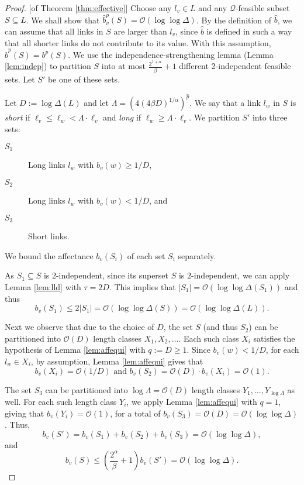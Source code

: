\documentclass[11pt]{amsart}
\newcommand{\cal}[1]{\mathcal{#1}}
\newcommand{\BO}{\mathcal{O}}
\def\calQ{{\cal Q}}
\begin{document}
\begin{proof}{[of Theorem \ref{thm:effective}]}
Choose any $l_v \in L$ and any $\calQ$-feasible subset $S \subseteq L$. We shall show that $\hat{b}^p_v(S)  = \BO(\log \log \Delta)$. By the definition of $\hat b$,
we can assume that all links in $S$ are larger than $l_v$, since $\hat b$ is defined in such a way that all shorter links do not contribute to its value. With this assumption, $\hat b^p(S) = b^p(S)$. 
We use the independence-strengthening lemma (Lemma \ref{lem:indep}) 
to partition $S$ into
at most $\frac{2^{1+\alpha}}{\beta}+1$ different 2-independent feasible sets. 
Let $S'$ be one of these sets.

Let $D := \log \Delta(L)$ and let $\Lambda = (4 (4\beta D)^{1/\alpha})^{\hat{p}}$.
We say that a link $l_w$ in $S$ is \emph{short} if
$\ell_v \le \ell_w < \Lambda \cdot \ell_v$
and \emph{long} if $\ell_w \ge \Lambda \cdot \ell_v$.
We partition $S'$ into three sets:


\begin{description}
\item[$S_1$] Long links $l_w$ with $b_v(w) \ge 1/D$,

\item[$S_2$] Long links $l_w$ with $b_v(w) < 1/D$, and

\item[$S_3$] Short links.
\end{description}
We bound the affectance $b_v(S_i)$ of each set $S_i$ separately. 

As $S_1\subseteq S$ is $2$-independent, since its superset $S$ is $2$-independent, we can apply Lemma \ref{lem:lld} with $\tau=2D$. This implies that $|S_1| = \BO(\log\log \Delta(S_1))$ and thus 
\[b_v(S_1) \le 2|S_1| = \BO(\log\log \Delta(S)) =
\BO(\log\log \Delta(L)).\]

Next we observe that due to the choice of $D$, the set $S$ (and thus $S_2$) can be partitioned into $\BO(D)$ length classes $X_1, X_2, \dots$. 
Each such class $X_i$
satisfies the hypothesis of Lemma \ref{lem:affequi} with $q:=D \geq 1$.
Since $b_v(w) < 1/D$, for each $l_w \in X_i$, by assumption, 
Lemma \ref{lem:affequi} gives that
\[b_v(X_i) = \BO(1/D)\text{ and }b_v(S_2) = \BO(D) \cdot b_v(X_i) = \BO(1).\] 

The set $S_3$ can be partitioned into $\log \Lambda = \BO(D)$ 
length classes $Y_1,\dots,Y_{\log \Lambda}$ as well. For each such length class $Y_i$,
we apply Lemma \ref{lem:affequi} with $q = 1$, giving that
$b_v(Y_i) = \BO(1)$, for a total of $b_v(S_3) = \BO(D) = \BO(\log\log \Delta)$. Thus, 
\[b_v(S') = b_v(S_1) + b_v(S_2) + b_v(S_3) = \BO(\log\log \Delta),\]
and
\[b_v(S) \le \left(\frac{2^\alpha}{\beta}+1\right) b_v(S') = \BO(\log\log \Delta).\]  
\end{proof}
\end{document}
